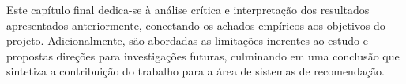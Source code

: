 
Este capítulo final dedica-se à análise crítica e interpretação dos resultados apresentados anteriormente, conectando os achados empíricos aos objetivos do projeto. Adicionalmente, são abordadas as limitações inerentes ao estudo e propostas direções para investigações futuras, culminando em uma conclusão que sintetiza a contribuição do trabalho para a área de sistemas de recomendação.





